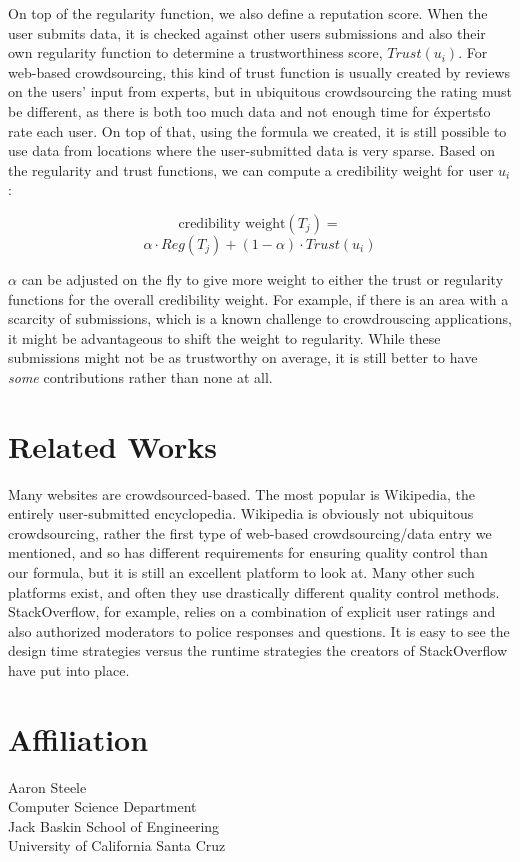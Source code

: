 \documentclass[9pt,twocolumn]{article}
\begin{document}
	On top of the regularity function, we also define a reputation score. When the user submits data, it is checked against other users submissions and also their own regularity function to determine a trustworthiness score, $Trust(u_i)$. For web-based crowdsourcing, this kind of trust function is usually created by reviews on the users' input from experts, but in ubiquitous crowdsourcing the rating must be different, as there is both too much data and not enough time for \'experts\' to rate each user. On top of that, using the formula we created, it is still possible to use data from locations where the user-submitted data is very sparse. Based on the regularity and trust functions, we can compute a credibility weight for user $u_i$:
	
	$$\text{credibility weight} (T_j) = $$ 
	$$\alpha \cdot Reg(T_j) + (1 - \alpha) \cdot Trust(u_i)$$
	
	$\alpha$ can be adjusted on the fly to give more weight to either the trust or regularity functions for the overall credibility weight. For example, if there is an area with a scarcity of submissions, which is a known challenge to crowdrouscing applications, \cite{doan2011crowdsourcing} it might be advantageous to shift the weight to regularity. While these submissions might not be as trustworthy on average, it is still better to have \emph{some} contributions rather than none at all. 
	
	\section*{Related Works}	
	Many websites are crowdsourced-based. The most popular is Wikipedia, the entirely user-submitted encyclopedia. Wikipedia is obviously not ubiquitous crowdsourcing, rather the first type of web-based crowdsourcing/data entry we mentioned, and so has different requirements for ensuring quality control than our formula, but it is still an excellent platform to look at. Many other such platforms exist, and often they use drastically different quality control methods. StackOverflow, for example, relies on a combination of explicit user ratings and also authorized moderators to police responses and questions. It is easy to see the design time strategies versus the runtime strategies the creators of StackOverflow have put into place. 
	
	\section*{Affiliation}
	Aaron Steele\\
	Computer Science Department\\
	Jack Baskin School of Engineering\\
	University of California Santa Cruz
	
\end{document}
